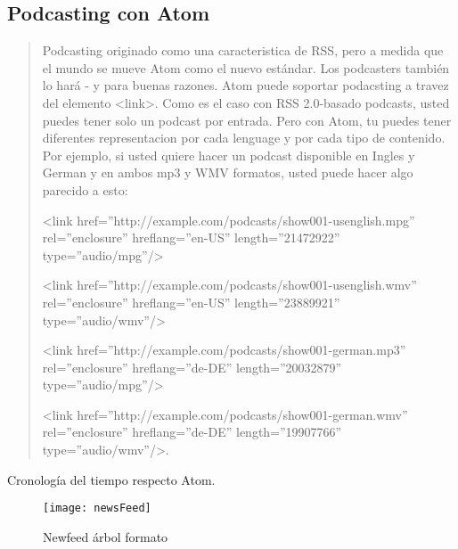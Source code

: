 \normalsize

\subsection{Podcasting con Atom}

\scriptsize

\blockquote{

Podcasting originado como una caracteristica de RSS, pero a medida que el mundo se mueve Atom como el nuevo estándar.
Los podcasters también lo hará - y para buenas razones. Atom puede soportar podacsting a travez del elemento <link>.
Como es el caso con RSS 2.0-basado podcasts, usted puedes tener solo un podcast por entrada. Pero con Atom, tu puedes
tener diferentes representacion por cada lenguage y por cada tipo de contenido. Por ejemplo, si usted quiere hacer un
podcast disponible en Ingles y German y en ambos mp3 y WMV formatos, usted puede hacer algo parecido a esto:

<link href=”http://example.com/podcasts/show001-usenglish.mpg”
rel=”enclosure” hreflang=”en-US” length=”21472922” type=”audio/mpg”/>

<link href=”http://example.com/podcasts/show001-usenglish.wmv”
rel=”enclosure” hreflang=”en-US” length=”23889921” type=”audio/wmv”/>

<link href=”http://example.com/podcasts/show001-german.mp3”
rel=”enclosure” hreflang=”de-DE” length=”20032879” type=”audio/mpg”/>

<link href=”http://example.com/podcasts/show001-german.wmv”
rel=”enclosure” hreflang=”de-DE” length=”19907766” type=”audio/wmv”/>.\cite{johnson2006rss}

}

\normalsize

Cronolog\'{i}a del tiempo respecto Atom.

\begin{figure}[!htb]
\centering
\texttt{[image: newsFeed]}
\caption{Newfeed árbol formato}
\end{figure}

